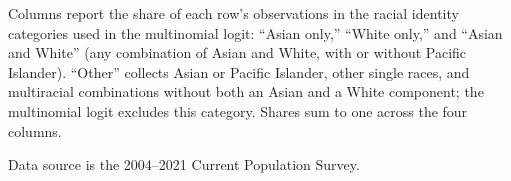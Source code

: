\begin{table}[H]
\begin{threeparttable}
\begin{tablenotes}
\item[2] Columns report the share of each row's observations in the racial identity categories used in the multinomial logit: ``Asian only,'' ``White only,'' and ``Asian and White'' (any combination of Asian and White, with or without Pacific Islander). ``Other'' collects Asian or Pacific Islander, other single races, and multiracial combinations without both an Asian and a White component; the multinomial logit excludes this category. Shares sum to one across the four columns.
\item[3] Data source is the 2004--2021 Current Population Survey.
\end{tablenotes}
\end{threeparttable}
\end{table}
